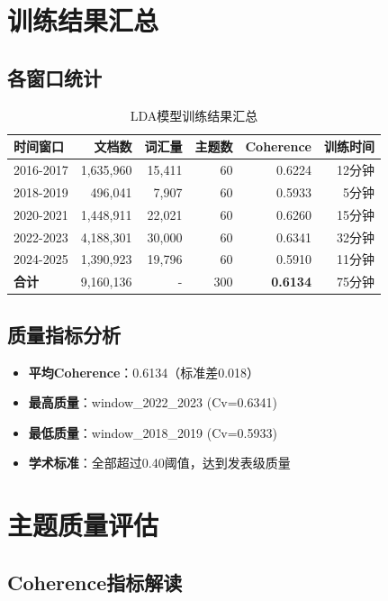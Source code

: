\documentclass[11pt,a4paper]{article}
\begin{document}
\section{训练结果汇总}

\subsection{各窗口统计}

\begin{table}[h]
\centering
\begin{tabular}{lrrrrr}
\toprule
\textbf{时间窗口} & \textbf{文档数} & \textbf{词汇量} & \textbf{主题数} & \textbf{Coherence} & \textbf{训练时间} \\
\midrule
2016-2017 & 1,635,960 & 15,411 & 60 & 0.6224 & 12分钟 \\
2018-2019 & 496,041 & 7,907 & 60 & 0.5933 & 5分钟 \\
2020-2021 & 1,448,911 & 22,021 & 60 & 0.6260 & 15分钟 \\
2022-2023 & 4,188,301 & 30,000 & 60 & 0.6341 & 32分钟 \\
2024-2025 & 1,390,923 & 19,796 & 60 & 0.5910 & 11分钟 \\
\midrule
\textbf{合计} & 9,160,136 & - & 300 & \textbf{0.6134} & 75分钟 \\
\bottomrule
\end{tabular}
\caption{LDA模型训练结果汇总}
\end{table}

\subsection{质量指标分析}

\begin{itemize}
    \item \textbf{平均Coherence}：0.6134（标准差0.018）
    \item \textbf{最高质量}：window\_2022\_2023 (Cv=0.6341)
    \item \textbf{最低质量}：window\_2018\_2019 (Cv=0.5933)
    \item \textbf{学术标准}：全部超过0.40阈值，达到发表级质量
\end{itemize}

\section{主题质量评估}

\subsection{Coherence指标解读}
\end{document}
